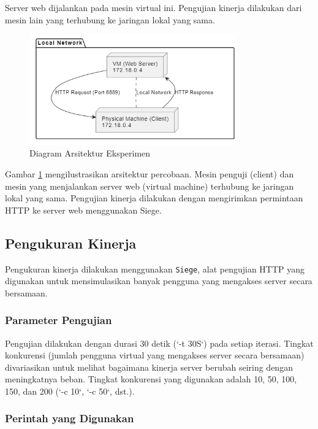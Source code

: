 \documentclass[12pt]{article}
\begin{document}
Server web dijalankan pada mesin virtual ini. Pengujian kinerja dilakukan dari mesin lain yang terhubung ke jaringan lokal yang sama. 

\begin{figure}[h!]
\centering
\includegraphics[width=0.8\textwidth]{img/architecture_diagram.png}
\caption{Diagram Arsitektur Eksperimen}
\label{fig:arch}
\end{figure}

Gambar \ref{fig:arch} mengilustrasikan arsitektur percobaan. Mesin penguji (client) dan mesin yang menjalankan server web (virtual machine) terhubung ke jaringan lokal yang sama. Pengujian kinerja dilakukan dengan mengirimkan permintaan HTTP ke server web menggunakan Siege.

\subsection{Pengukuran Kinerja}

Pengukuran kinerja dilakukan menggunakan \texttt{Siege}, alat pengujian HTTP yang digunakan untuk mensimulasikan banyak pengguna yang mengakses server secara bersamaan.

\subsubsection{Parameter Pengujian}

Pengujian dilakukan dengan durasi 30 detik (`-t 30S`) pada setiap iterasi. Tingkat konkurensi (jumlah pengguna virtual yang mengakses server secara bersamaan) divariasikan untuk melihat bagaimana kinerja server berubah seiring dengan meningkatnya beban. Tingkat konkurensi yang digunakan adalah 10, 50, 100, 150, dan 200 (`-c 10`, `-c 50`, dst.).

\subsubsection{Perintah yang Digunakan}
\end{document}
